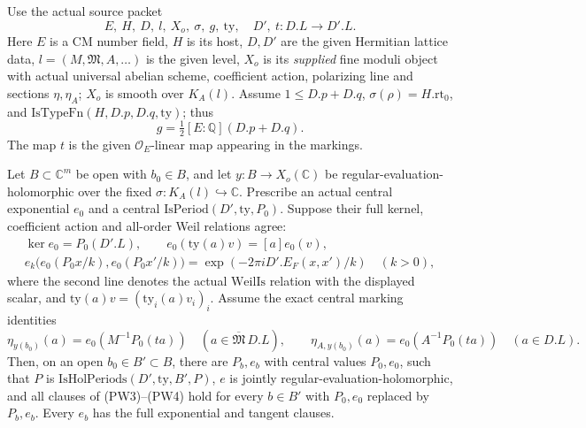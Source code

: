 \begin{proposition}
\label{prop:ftb-actual-local-pel-period-lift}
Use the actual source packet
\[
        E,\ H,\ D,\ l,\ X_o,\ \sigma,\ g,\ \mathrm{ty},
                    \quad D',\ t:D.L\to D'.L .
\]
Here \(E\) is a CM number field, \(H\) is its host,
\(D,D'\) are the given Hermitian lattice data,
\(l=(M,\mathfrak M,A,\ldots)\) is the given level,
\(X_o\) is its \emph{supplied} fine moduli object with
actual universal abelian scheme, coefficient action,
polarizing line and sections \(\eta,\eta_A\);
\(X_o\) is smooth over \(K_A(l)\).
Assume \(1\le D.p+D.q\),
\(\sigma(\rho)=H.\mathrm{rt}_0\), and
\(\mathrm{IsTypeFn}(H,D.p,D.q,\mathrm{ty})\);
thus
\[
                         g=\tfrac12[E:\mathbb Q](D.p+D.q).
\]
The map \(t\) is the given \(\mathcal O_E\)-linear map
appearing in the markings.

Let \(B\subset\mathbb C^m\) be open with \(b_0\in B\),
and let \(y:B\to X_o(\mathbb C)\) be
regular-evaluation-holomorphic over the fixed
\(\sigma:K_A(l)\hookrightarrow\mathbb C\).
Prescribe an actual central exponential \(e_0\)
and a central \(\mathrm{IsPeriod}(D',\mathrm{ty},P_0)\).
Suppose their full kernel, coefficient action and
all-order Weil relations agree:
\[
\begin{gathered}
 \ker e_0=P_0(D'.L),\qquad
 e_0(\mathrm{ty}(a)v)=[a]e_0(v),\\
 e_k\bigl(e_0(P_0x/k),e_0(P_0x'/k)\bigr)
                   =\exp(-2\pi iD'.E_F(x,x')/k)
                         \quad(k>0),                       \tag{PW3}
\end{gathered}
\]
where the second line denotes the actual \(\mathrm{WeilIs}\)
relation with the displayed scalar, and
\(\mathrm{ty}(a)v=(\mathrm{ty}_i(a)v_i)_i\).
Assume the exact central marking identities
\[
 \eta_{y(b_0)}(a)=e_0(M^{-1}P_0(ta))
       \quad(a\in\overline{\mathfrak M}\,D.L),\qquad
 \eta_{A,y(b_0)}(a)=e_0(A^{-1}P_0(ta))\quad(a\in D.L).
                                                               \tag{PW4}
\]
Then, on an open \(b_0\in B'\subset B\), there are
\(P_b,e_b\) with central values \(P_0,e_0\), such that
\(P\) is \(\mathrm{IsHolPeriods}(D',\mathrm{ty},B',P)\),
\(e\) is jointly regular-evaluation-holomorphic, and
all clauses of (PW3)--(PW4) hold for every \(b\in B'\)
with \(P_0,e_0\) replaced by \(P_b,e_b\).
Every \(e_b\) has the full exponential and tangent clauses.
\end{proposition}
